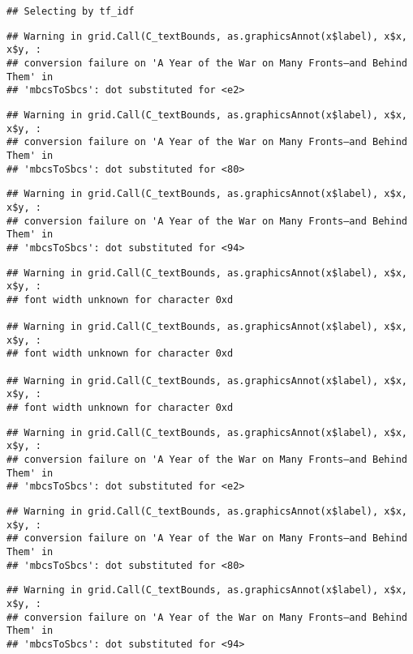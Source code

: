 \documentclass[]{article}
\begin{document}
\begin{verbatim}
## Selecting by tf_idf
\end{verbatim}

\begin{verbatim}
## Warning in grid.Call(C_textBounds, as.graphicsAnnot(x$label), x$x, x$y, :
## conversion failure on 'A Year of the War on Many Fronts—and Behind Them' in
## 'mbcsToSbcs': dot substituted for <e2>
\end{verbatim}

\begin{verbatim}
## Warning in grid.Call(C_textBounds, as.graphicsAnnot(x$label), x$x, x$y, :
## conversion failure on 'A Year of the War on Many Fronts—and Behind Them' in
## 'mbcsToSbcs': dot substituted for <80>
\end{verbatim}

\begin{verbatim}
## Warning in grid.Call(C_textBounds, as.graphicsAnnot(x$label), x$x, x$y, :
## conversion failure on 'A Year of the War on Many Fronts—and Behind Them' in
## 'mbcsToSbcs': dot substituted for <94>
\end{verbatim}

\begin{verbatim}
## Warning in grid.Call(C_textBounds, as.graphicsAnnot(x$label), x$x, x$y, :
## font width unknown for character 0xd

## Warning in grid.Call(C_textBounds, as.graphicsAnnot(x$label), x$x, x$y, :
## font width unknown for character 0xd

## Warning in grid.Call(C_textBounds, as.graphicsAnnot(x$label), x$x, x$y, :
## font width unknown for character 0xd
\end{verbatim}

\begin{verbatim}
## Warning in grid.Call(C_textBounds, as.graphicsAnnot(x$label), x$x, x$y, :
## conversion failure on 'A Year of the War on Many Fronts—and Behind Them' in
## 'mbcsToSbcs': dot substituted for <e2>
\end{verbatim}

\begin{verbatim}
## Warning in grid.Call(C_textBounds, as.graphicsAnnot(x$label), x$x, x$y, :
## conversion failure on 'A Year of the War on Many Fronts—and Behind Them' in
## 'mbcsToSbcs': dot substituted for <80>
\end{verbatim}

\begin{verbatim}
## Warning in grid.Call(C_textBounds, as.graphicsAnnot(x$label), x$x, x$y, :
## conversion failure on 'A Year of the War on Many Fronts—and Behind Them' in
## 'mbcsToSbcs': dot substituted for <94>
\end{verbatim}
\end{document}
